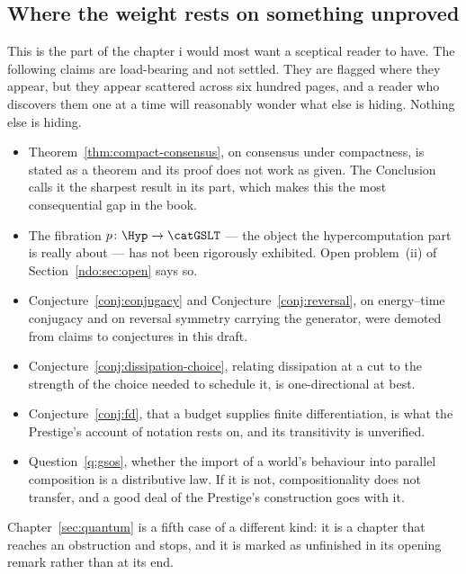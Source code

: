 \subsection*{Where the weight rests on something unproved}

This is the part of the chapter i would most want a sceptical
reader to have.
The following claims are load-bearing and not settled.
They are flagged where they appear, but they appear scattered
across six hundred pages, and a reader who discovers them one at a
time will reasonably wonder what else is hiding.
Nothing else is hiding.

\begin{itemize}[leftmargin=1.6em, itemsep=4pt]
\item Theorem~\ref{thm:compact-consensus}, on consensus under
      compactness, is stated as a theorem and its proof does not
      work as given.
      The Conclusion calls it the sharpest result in its part,
      which makes this the most consequential gap in the book.
\item The fibration $p\colon\Hyp\to\catGSLT$ --- the object the
      hypercomputation part is really about --- has not been
      rigorously exhibited.
      Open problem~(ii) of Section~\ref{ndo:sec:open} says so.
\item Conjecture~\ref{conj:conjugacy} and
      Conjecture~\ref{conj:reversal}, on energy--time conjugacy
      and on reversal symmetry carrying the generator, were
      demoted from claims to conjectures in this draft.
\item Conjecture~\ref{conj:dissipation-choice}, relating
      dissipation at a cut to the strength of the choice needed to
      schedule it, is one-directional at best.
\item Conjecture~\ref{conj:fd}, that a budget supplies finite
      differentiation, is what the Prestige's account of notation
      rests on, and its transitivity is unverified.
\item Question~\ref{q:gsos}, whether the import of a world's
      behaviour into parallel composition is a distributive law.
      If it is not, compositionality does not transfer, and a
      good deal of the Prestige's construction goes with it.
\end{itemize}

\noindent
Chapter~\ref{sec:quantum} is a fifth case of a different kind: it
is a chapter that reaches an obstruction and stops, and it is
marked as unfinished in its opening remark rather than at its end.

